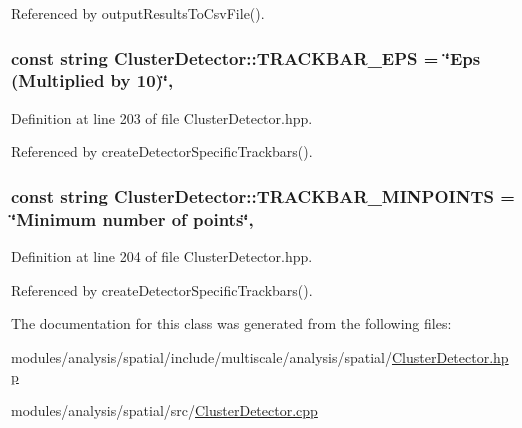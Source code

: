 Referenced by output\-Results\-To\-Csv\-File().

\hypertarget{classmultiscale_1_1analysis_1_1ClusterDetector_a656f64f88c73c25824e5a4416a742aaf}{
\subsubsection[{T\-R\-A\-C\-K\-B\-A\-R\-\_\-\-E\-P\-S}]{\setlength{\rightskip}{0pt plus 5cm}const string Cluster\-Detector\-::\-T\-R\-A\-C\-K\-B\-A\-R\-\_\-\-E\-P\-S = \char`\"{}Eps (Multiplied by 10)\char`\"{}\hspace{0.3cm}{\ttfamily [static]}, {\ttfamily [private]}}}\label{classmultiscale_1_1analysis_1_1ClusterDetector_a656f64f88c73c25824e5a4416a742aaf}


Definition at line 203 of file Cluster\-Detector.\-hpp.



Referenced by create\-Detector\-Specific\-Trackbars().

\hypertarget{classmultiscale_1_1analysis_1_1ClusterDetector_a7f0fbbf3de8479b106893c4a8161bdaf}{
\subsubsection[{T\-R\-A\-C\-K\-B\-A\-R\-\_\-\-M\-I\-N\-P\-O\-I\-N\-T\-S}]{\setlength{\rightskip}{0pt plus 5cm}const string Cluster\-Detector\-::\-T\-R\-A\-C\-K\-B\-A\-R\-\_\-\-M\-I\-N\-P\-O\-I\-N\-T\-S = \char`\"{}Minimum number of points\char`\"{}\hspace{0.3cm}{\ttfamily [static]}, {\ttfamily [private]}}}\label{classmultiscale_1_1analysis_1_1ClusterDetector_a7f0fbbf3de8479b106893c4a8161bdaf}


Definition at line 204 of file Cluster\-Detector.\-hpp.



Referenced by create\-Detector\-Specific\-Trackbars().



The documentation for this class was generated from the following files\-:\begin{DoxyCompactItemize}
\item 
modules/analysis/spatial/include/multiscale/analysis/spatial/\hyperlink{ClusterDetector_8hpp}{Cluster\-Detector.\-hpp}\item 
modules/analysis/spatial/src/\hyperlink{ClusterDetector_8cpp}{Cluster\-Detector.\-cpp}\end{DoxyCompactItemize}

